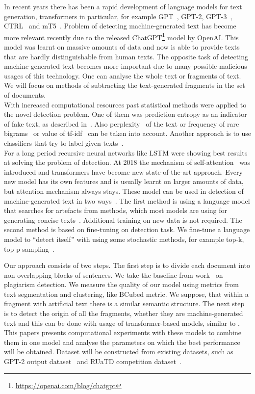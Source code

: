 \documentclass{article}
\begin{document}
In recent years there has been a rapid development of language models for text generation, transformers in particular, for example GPT~\cite{gpt}, GPT-2\cite{gpt2}, GPT-3~\cite{gpt3}, CTRL~\cite{ctrl} and mT5~\cite{mt5}. Problem of detecting machine-generated text has become more relevant recently due to the released ChatGPT\footnote{\url{https://openai.com/blog/chatgpt}} model by OpenAI. This model was learnt on massive amounts of data and now is able to provide texts that are hardly distinguishable from human texts. The opposite task of detecting machine-generated text becomes more important due to many possible malicious usages of this technology. One can analyse the whole text or fragments of text.
We will focus on methods of subtracting the text-generated fragments in the set of documents.\\
With increased computational resources past statistical methods were applied to the novel detection problem. One of them was prediction entropy as an indicator of fake text, as described in~\cite{relativeentropy}. Also perplexity~\cite{perplexity} of the text or frequency of rare bigrams~\cite{rare_bigrams} or value of tf-idf~\cite{solaiman} can be taken into account. Another approach is to use classifiers that try to label given texts~\cite{Kuznetsov}.\\
For a long period recursive neural networks like LSTM were showing best results at solving the problem of detection. At 2018 the mechanism of self-attention~\cite{Vaswani} was introduced and transformers have become new state-of-the-art approach.  Every new model has its own features and is usually learnt on larger amounts of data, but attention mechanism always stays. These model can be used in detection of machine-generated text in two ways~\cite{solaiman}. The first method is using a language model that searches for artefacts from  methods, which most models are using for generating concise texts~\cite{gltr}. Additional training on new data is not required. The second method is based on fine-tuning on detection task. We fine-tune a language model to “detect itself” with using some stochastic methods, for example top-k, top-p sampling~\cite{gritsay2022}.

Our approach consists of two steps. The first step is to divide each document into non-overlapping blocks of sentences. We take the baseline from work~\cite{Kuznetsov} on plagiarism detection.  We measure the quality of our model using metrics from text segmentation and clustering, like BCubed metric. We suppose, that within a fragment with artificial text there is a similar semantic structure.  The next step is to detect the origin of all the fragments, whether they are machine-generated text and this can be done with usage of transformer-based models, similar to \cite{gritsay2022}. This papers presents computational experiments with these models to combine them in one model and analyse the parameters on which the best performance will be obtained. Dataset will be constructed from existing datasets, such as GPT-2 output dataset~\cite{gpt2-dataset} and RUaTD competition dataset~\cite{ruatd-dataset}.  %
\end{document}
